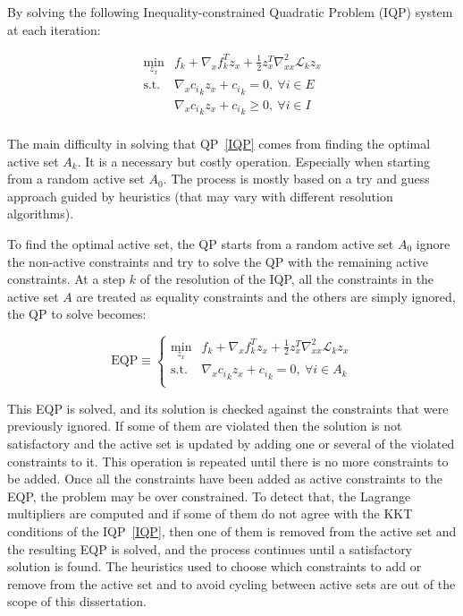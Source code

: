 By solving the following Inequality-constrained Quadratic Problem (IQP) system at each iteration:

\begin{equation}
\label{IQP}
  \begin{array}{ll}
    \min\limits_{z_x} &f_k + \nabla_x f_k ^T z_x + \frac{1}{2} z_x^T\nabla_{xx}^2\mathcal{L}_k z_x \\
    \text{s.t.} & \nabla_x {c_i}_k z_x + {c_i}_k = 0 ,\ \forall i\in E\\
                & \nabla_x {c_i}_k z_x + {c_i}_k \geq 0 ,\ \forall i\in I\\
  \end{array}
\end{equation}

The main difficulty in solving that QP~\ref{IQP} comes from finding the optimal active set $\mathit{A}_k$.
It is a necessary but costly operation.
Especially when starting from a random active set $\mathit{A}_0$.
The process is mostly based on a try and guess approach guided by heuristics (that may vary with different resolution algorithms).

To find the optimal active set, the QP starts from a random active set $\mathit{A}_0$ ignore the non-active constraints and try to solve the QP with the remaining active constraints.
At a step $k$ of the resolution of the IQP, all the constraints in the active set $\mathit{A}$ are treated as equality constraints and the others are simply ignored, the QP to solve becomes:

\begin{equation}
  \text{EQP} \equiv \left\{
  \begin{array}{ll}
    \min\limits_{z_x} &f_k + \nabla_x f_k ^T z_x + \frac{1}{2} z_x^T\nabla_{xx}^2\mathcal{L}_k z_x \\
    \text{s.t.} & \nabla_x {c_i}_k z_x + {c_i}_k = 0 ,\ \forall i\in \mathit{A}_k\\
  \end{array}
  \right.
\end{equation}

This EQP is solved, and its solution is checked against the constraints that were previously ignored.
If some of them are violated then the solution is not satisfactory and the active set is updated by adding one or several of the violated constraints to it.
This operation is repeated until there is no more constraints to be added.
Once all the constraints have been added as active constraints to the EQP, the problem may be over constrained.
To detect that, the Lagrange multipliers are computed and if some of them do not agree with the KKT conditions of the IQP~\ref{IQP}, then one of them is removed from the active set and the resulting EQP is solved, and the process continues until a satisfactory solution is found.
The heuristics used to choose which constraints to add or remove from the active set and to avoid cycling between active sets are out of the scope of this dissertation.

